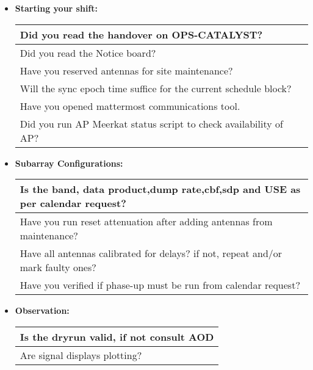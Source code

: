 \begin{itemize}


\item[] \textbf{Starting your shift:}

\begin{table}[H]
	
	\label{tab:checklist}
	\begin{tabular}[b]{|p{16 cm}|} 
		\hline
 Did you read the handover on OPS-CATALYST?\\
\hline
Did you read the Notice board?\\
\hline
Have you reserved antennas for site maintenance?\\
\hline
Will the sync epoch time suffice for the current schedule block?\\
\hline
Have you opened mattermost communications tool.\\
\hline
Did you run AP Meerkat status script to check availability of AP?\\
\hline
	
	\end{tabular}
\end{table}

 


\item[] \textbf{Subarray Configurations:
}
\begin{table}[H]
	
	\label{tab:checklist}
	\begin{tabular}[b]{|p{16 cm}|} 
		\hline
	Is the band, data product,dump rate,cbf,sdp and USE as per calendar request?\\
	\hline
	Have you run reset attenuation after adding antennas from maintenance?\\
	\hline
	Have all antennas calibrated for delays? if not, repeat and/or mark faulty ones?\\
	\hline
	Have you verified if phase-up must be run from calendar request?\\
	\hline
	
		
	\end{tabular}
\end{table}


 
 

\item[] \textbf{Observation:
}
\begin{table}[H]
	
	\label{tab:checklist}
	\begin{tabular}[b]{|p{16 cm}|} 
		\hline
 Is the dryrun valid, if not consult AOD\\
	\hline
	Are signal displays plotting?\\
	\hline
	

\end{tabular}
\end{table}
\end{itemize}
